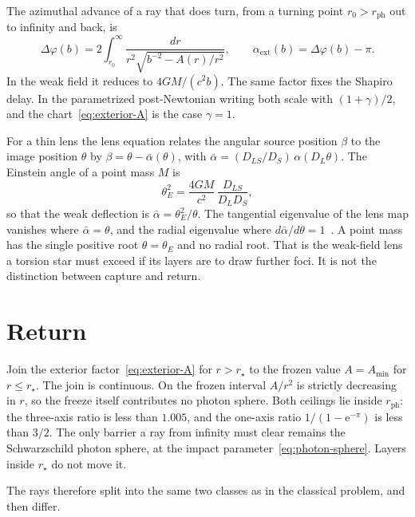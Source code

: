 \documentclass[a4paper]{article}
\begin{document}
The azimuthal advance of a ray that does turn, from a turning point \(r_0>r_{\mathrm{ph}}\) out to infinity and back, is
\begin{equation}
\label{eq:deflection-integral}
\Delta\varphi(b)
  =2\int_{r_0}^{\infty}
    \frac{dr}{r^2\sqrt{b^{-2}-A(r)/r^2}},
\qquad
\alpha_{\mathrm{ext}}(b)=\Delta\varphi(b)-\pi.
\end{equation}
In the weak field it reduces to \(4GM/(c^2 b)\). The same factor fixes the Shapiro delay. In the parametrized post-Newtonian writing both scale with \((1+\gamma)/2\), and the chart~\eqref{eq:exterior-A} is the case \(\gamma=1\).

For a thin lens the lens equation relates the angular source position \(\beta\) to the image position \(\theta\) by \(\beta=\theta-\bar\alpha(\theta)\), with \(\bar\alpha=(D_{LS}/D_S)\,\alpha(D_L\theta)\). The Einstein angle of a point mass \(M\) is
\begin{equation}
\label{eq:einstein}
\theta_E^2=\frac{4GM}{c^2}\,\frac{D_{LS}}{D_L D_S},
\end{equation}
so that the weak deflection is \(\bar\alpha=\theta_E^2/\theta\). The tangential eigenvalue of the lens map vanishes where \(\bar\alpha=\theta\), and the radial eigenvalue where \(d\bar\alpha/d\theta=1\)~\cite{NarayanBartelmann1996}. A point mass has the single positive root \(\theta=\theta_E\) and no radial root. That is the weak-field lens a torsion star must exceed if its layers are to draw further foci. It is not the distinction between capture and return.

\section{Return}
\label{sec:return}

Join the exterior factor~\eqref{eq:exterior-A} for \(r>r_\star\) to the frozen value \(A=A_{\min}\) for \(r\le r_\star\). The join is continuous. On the frozen interval \(A/r^2\) is strictly decreasing in \(r\), so the freeze itself contributes no photon sphere. Both ceilings lie inside \(r_{\mathrm{ph}}\): the three-axis ratio is less than \(1.005\), and the one-axis ratio \(1/(1-\mathrm{e}^{-\pi})\) is less than \(3/2\). The only barrier a ray from infinity must clear remains the Schwarzschild photon sphere, at the impact parameter~\eqref{eq:photon-sphere}. Layers inside \(r_\star\) do not move it.

The rays therefore split into the same two classes as in the classical problem, and then differ.
\end{document}
